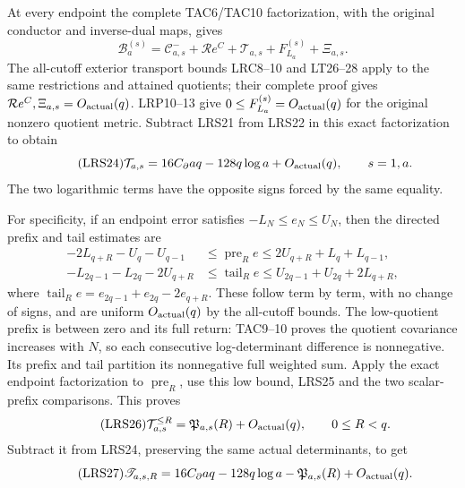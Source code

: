 \documentclass[11pt,a4paper]{article}
\begin{document}
At every endpoint the complete TAC6/TAC10 factorization, with the
original conductor and inverse-dual maps, gives
\[
 \mathcal B_a^{(s)}=
 \mathcal C^-_{a,s}+\mathcal R e^C
      +\mathcal T_{a,s}+F_{L_a}^{(s)}+\Xi_{a,s}.
\]
The all-cutoff exterior transport bounds LRC8--10 and LT26--28 apply to the same
restrictions and attained quotients; their complete proof gives
$\mathcal R e^C,\Xi_{a,s}=O_{\rm actual}(q)$.
LRP10--13 give $0\le F_{L_a}^{(s)}=O_{\rm actual}(q)$ for the
original nonzero quotient metric.  Subtract LRS21 from LRS22 in
this exact factorization to obtain
\begin{equation}\tag{LRS24}
 \mathcal T_{a,s}=16C_\partial aq-128q\log a+O_{\rm actual}(q),
 \qquad s=1,a.
\end{equation}
The two logarithmic terms have the opposite signs forced by the
same equality.

For specificity, if an endpoint error satisfies $-L_N\le e_N\le U_N$,
then the directed prefix and tail estimates are
\begin{equation}\tag{LRS25}
\begin{split}
 -2L_{q+R}-U_q-U_{q-1}
 &\le\operatorname{pre}_Re\le2U_{q+R}+L_q+L_{q-1},\\
 -L_{2q-1}-L_{2q}-2U_{q+R}
 &\le\operatorname{tail}_Re
       \le U_{2q-1}+U_{2q}+2L_{q+R},
\end{split}
\end{equation}
where $\operatorname{tail}_Re=e_{2q-1}+e_{2q}-2e_{q+R}$.
These follow term by term, with no change of signs, and are uniform
$O_{\rm actual}(q)$ by the all-cutoff bounds.  The low-quotient
prefix is between zero and its full return: TAC9--10 proves the
quotient covariance increases with $N$, so each consecutive
log-determinant difference is nonnegative.  Its prefix and tail
partition its nonnegative full weighted sum.  Apply the exact
endpoint factorization to $\operatorname{pre}_R$, use this low bound,
LRS25 and the two scalar-prefix comparisons.  This proves
\begin{equation}\tag{LRS26}
 \mathcal T_{a,s}^{\le R}=\mathfrak P_{a,s}(R)+O_{\rm actual}(q),
 \qquad 0\le R<q.
\end{equation}
Subtract it from LRS24, preserving the same actual determinants, to get
\begin{equation}\tag{LRS27}
 \mathscr T_{a,s,R}=16C_\partial aq-128q\log a
                     -\mathfrak P_{a,s}(R)+O_{\rm actual}(q).
\end{equation}
\end{document}

